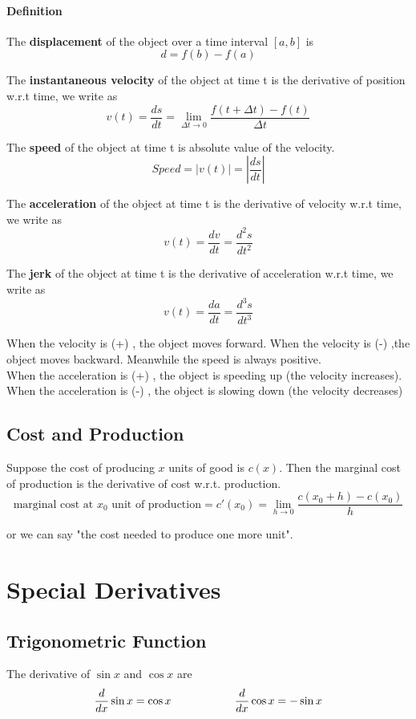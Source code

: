 \documentclass[12pt]{article}
\newcommand\tab[1][1cm]{\hspace*{#1}}
\begin{document}
\paragraph{Definition} 
\[\]
The \textbf{displacement} of the object over a time interval $[a, b]$ is 
\[
    d = f(b) - f(a)
\]

The \textbf{instantaneous velocity} of the object at time t  is the derivative of position w.r.t time, we write as 
\[
    v(t) = \frac{ds}{dt} = \lim_{\Delta t \to 0} \frac{f(t +\Delta t) - f(t)}{\Delta t} 
\]

The \textbf{speed} of the object at time t  is absolute value of the velocity.
\[
    Speed = |v(t)| = \left| \frac{ds}{dt} \right|
\]

The \textbf{acceleration} of the object at time t  is the derivative of velocity w.r.t time, we write as 
\[
    v(t) = \frac{dv}{dt} = \frac{d^2 s}{dt^2} 
\]

The \textbf{jerk} of the object at time t  is the derivative of acceleration w.r.t time, we write as 
\[
    v(t) = \frac{da}{dt} = \frac{d^3 s}{dt^3} 
\]

\noindent
When the velocity is (+) , the object moves forward. When the velocity is (-) ,the object moves backward.
Meanwhile the speed is always positive.\\
When the acceleration is (+) , the object is speeding up (the velocity increases). When the acceleration is (-) ,
the object is slowing down (the velocity decreases)

\subsection{Cost and Production}
Suppose the cost of producing $x$ units of good is $c(x)$.
Then the marginal cost of production is the derivative of cost
w.r.t. production.
\[
    \textrm{marginal cost at $x_0$ unit of production} = c'(x_0) = \lim_{h \to 0} \frac{c(x_0 +h ) - c(x_0)}{h} 
\]

\noindent
or we can say "the cost needed to produce one more unit".

\section{Special Derivatives}
\subsection{Trigonometric Function}
The derivative of $\sin x$ and $\cos x$ are
\[
    \frac{d}{dx} \sin x = \cos x \textrm{\tab \tab}  \frac{d}{dx} \cos x = - \sin x
\]
\end{document}
